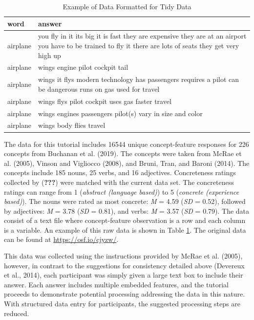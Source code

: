\documentclass[man]{apa6}
\begin{document}
\begin{table}[t]

\caption{\label{tab:tab1}Example of Data Formatted for Tidy Data}
\centering
\begin{tabular}{l>{\raggedright\arraybackslash}p{30em}}
\toprule
word & answer\\
\midrule
airplane & you fly in it  its big  it is fast  they are expensive  they are at an airport  you have to be trained to fly it  there are lots of seats  they get very high up\\
airplane & wings engine pilot cockpit tail\\
airplane & wings  it flys  modern technology  has passengers  requires a pilot  can be dangerous  runs on gas  used for travel\\
airplane & wings  flys  pilot  cockpit  uses gas  faster travel\\
airplane & wings  engines  passengers  pilot(s)  vary in size and color\\
\addlinespace
airplane & wings  body  flies  travel\\
\bottomrule
\end{tabular}
\end{table}

The data for this tutorial includes 16544 unique concept-feature responses for 226 concepts from Buchanan et al. (2019). The concepts were taken from McRae et al. (2005), Vinson and Vigliocco (2008), and Bruni, Tran, and Baroni (2014). The concepts include 185 nouns, 25 verbs, and 16 adjectives. Concreteness ratings collected by ({\textbf{???}}) were matched with the current data set. The concreteness ratings can range from 1 (\emph{abstract (language based)}) to 5 (\emph{concrete (experience based)}). The nouns were rated as most concrete: \emph{M} = 4.59 (\emph{SD} = 0.52), followed by adjectives: \emph{M} = 3.78 (\emph{SD} = 0.81), and verbs: \emph{M} = 3.57 (\emph{SD} = 0.79). The data consist of a text file where concept-feature observation is a row and each column is a variable. An example of this raw data is shown in Table \ref{tab:tab1}. The original data can be found at \url{https://osf.io/cjyzw/}.

This data was collected using the instructions provided by McRae et al. (2005), however, in contrast to the suggestions for consistency detailed above (Devereux et al., 2014), each participant was simply given a large text box to include their answer. Each answer includes multiple embedded features, and the tutorial proceeds to demonstrate potential processing addressing the data in this nature. With structured data entry for participants, the suggested processing steps are reduced.
\end{document}
